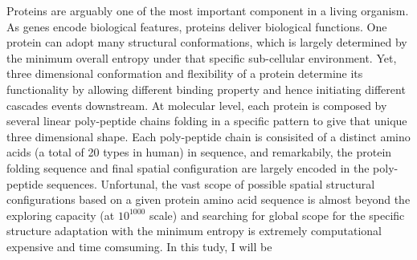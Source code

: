 Proteins are arguably one of the most important component in a living organism. As genes encode biological features, proteins deliver biological functions. One protein can adopt many structural conformations, which is largely determined by the minimum overall entropy under that specific sub-cellular environment. Yet, three dimensional conformation and flexibility of a protein determine its functionality by allowing different binding property and hence initiating different cascades events downstream. At molecular level, each protein is composed by several linear poly-peptide chains folding in a specific pattern to give that unique three dimensional shape. Each poly-peptide chain is consisited of a distinct amino acids (a total of 20 types in human) in sequence, and remarkabily, the protein folding sequence and final spatial configuration are largely encoded in the poly-peptide sequences. Unfortunal, the vast scope of possible spatial structural configurations based on a given protein amino acid sequence is almost beyond the exploring capacity (at $10^{1000}$ scale) and searching for global scope for the specific structure adaptation with the minimum entropy is extremely computational expensive and time comsuming. In this tudy, I will be 